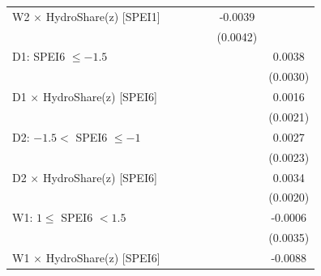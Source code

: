 {\begin{tabular}{l*{6}{c}}
\addlinespace
W2 $\times$ HydroShare(z) [SPEI1]&                     &                     &                     &                     &     -0.0039         &                     \\
                    &                     &                     &                     &                     &    (0.0042)         &                     \\
\addlinespace
D1: SPEI6 $\leq -1.5$&                     &                     &                     &                     &                     &      0.0038         \\
                    &                     &                     &                     &                     &                     &    (0.0030)         \\
\addlinespace
D1 $\times$ HydroShare(z) [SPEI6]&                     &                     &                     &                     &                     &      0.0016         \\
                    &                     &                     &                     &                     &                     &    (0.0021)         \\
\addlinespace
D2: $-1.5 <$ SPEI6 $\leq -1$&                     &                     &                     &                     &                     &      0.0027         \\
                    &                     &                     &                     &                     &                     &    (0.0023)         \\
\addlinespace
D2 $\times$ HydroShare(z) [SPEI6]&                     &                     &                     &                     &                     &      0.0034         \\
                    &                     &                     &                     &                     &                     &    (0.0020)         \\
\addlinespace
W1: $1 \leq$ SPEI6 $< 1.5$&                     &                     &                     &                     &                     &     -0.0006         \\
                    &                     &                     &                     &                     &                     &    (0.0035)         \\
\addlinespace
W1 $\times$ HydroShare(z) [SPEI6]&                     &                     &                     &                     &                     &     -0.0088\sym{***}\\

\end{tabular}}
